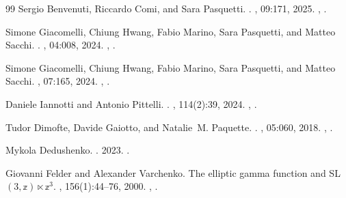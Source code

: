 \documentclass[11pt,a4paper]{article}
\numberwithin{equation}{section}
\theoremstyle{plain}
\theoremstyle{definition}
\theoremstyle{remark}
\begin{document}
\begin{thebibliography}{99}
Sergio Benvenuti, Riccardo Comi, and Sara Pasquetti.
.
, 09:171, 2025.
\newblock \href {https://arxiv.org/abs/2410.19049} {},
  \href {https://doi.org/10.1007/JHEP09(2025)171}
  {}.

Simone Giacomelli, Chiung Hwang, Fabio Marino, Sara Pasquetti, and Matteo
  Sacchi.
.
, 04:008, 2024.
\newblock \href {https://arxiv.org/abs/2309.05326} {},
  \href {https://doi.org/10.1007/JHEP04(2024)008}
  {}.

Simone Giacomelli, Chiung Hwang, Fabio Marino, Sara Pasquetti, and Matteo
  Sacchi.
, 07:165, 2024.
\newblock \href {https://arxiv.org/abs/2401.14456} {},
  \href {https://doi.org/10.1007/JHEP07(2024)165}
  {}.

Daniele Iannotti and Antonio Pittelli.
.
, 114(2):39, 2024.
\newblock \href {https://arxiv.org/abs/2307.11634} {},
  \href {https://doi.org/10.1007/s11005-024-01788-x}
  {}.

Tudor Dimofte, Davide Gaiotto, and Natalie~M. Paquette.
.
, 05:060, 2018.
\newblock \href {https://arxiv.org/abs/1712.07654} {},
  \href {https://doi.org/10.1007/JHEP05(2018)060}
  {}.

Mykola Dedushenko.
.
 2023.
\newblock \href {https://arxiv.org/abs/2312.17747} {}.

Giovanni Felder and Alexander Varchenko.
\newblock The elliptic gamma function and {SL}$(3,\mathbb z)\ltimes \mathbb
  z^3$.
, 156(1):44--76, 2000.
\newblock \href {https://arxiv.org/abs/math/9907061}
  {}, \href {https://doi.org/10.1006/aima.2000.1942}
  {}.


\end{thebibliography}
\end{document}
